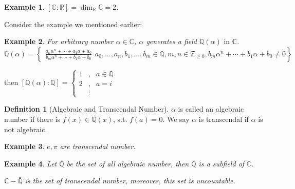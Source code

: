 \documentclass{article}
\theoremstyle{MyNonumberplain}
\theoremstyle{break}
\theoremstyle{break}
\newtheorem{example}{Example}[section]
\theoremstyle{break}
\theoremstyle{definition}
\theoremstyle{break}
\newtheorem{definition}{Definition}[section]
\begin{document}
\begin{expbox}
    \begin{example}
        $[\mathbb{C}: \mathbb{R}] = \dim_{\mathbb{R}} \mathbb{C}= 2$.
    \end{example}
\end{expbox}

Consider the example we mentioned earlier:
\begin{expbox}
    \begin{example}
        For arbitrary number $\alpha \in \mathbb{C}$, $\alpha$ generates a field
        $\mathbb{Q} (\alpha) \text{ in } \mathbb{C}$.
        \[ \mathbb{Q} (\alpha) = \left\{ \begin{array}{c|}
             \frac{a_n \alpha^n + \cdots + a_1 \alpha + a_0}{b_m \alpha^n + \cdots +
             b_1 \alpha + b_0}
           \end{array} a_0, \ldots, a_n, b_1, \ldots, b_m \in \mathbb{Q}, m, n \in
           \mathbb{Z}_{\geq 0}, b_m \alpha^n + \cdots + b_1 \alpha + b_0 \neq 0
           \right\} \]
    \end{example}
\end{expbox}
then $[\mathbb{Q} (\alpha) : \mathbb{Q}] = \left\{\begin{array}{lll}
    1 & , & a \in \mathbb{Q}\\
    2 & , & a = i\\
    & \vdots & 
\end{array}\right.$

\begin{defbox}
    \begin{definition}[Algebraic and Transcendal Number]
        $\alpha$ is called an algebraic number if there is $f (x) \in \mathbb{Q} (x)$,
        s.t. $f (a) = 0$. We say $\alpha$ is transcendal if $\alpha$ is not algebraic.
        
    \end{definition}
\end{defbox}

\begin{expbox}
    \begin{example}
        $e, \pi$ are transcendal number. 
    \end{example}
\end{expbox}

\begin{expbox}
    \begin{example}
        Let $\bar{\mathbb{Q}}$ be the set of all algebraic number, then
        $\bar{\mathbb{Q}}$ is a subfield of $\mathbb{C}$.\bigskip 
        
        $\mathbb{C}- \bar{\mathbb{Q}}$ is the set of transcendal number, moreover,
        this set is uncountable.
    \end{example}
\end{expbox}
\end{document}
